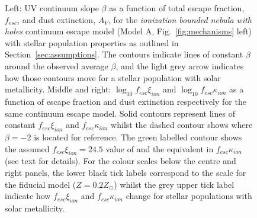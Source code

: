 \begin{figure}
  \caption{Left: UV continuum slope $\beta$ as a function of total escape fraction, $f_{esc}$, and dust extinction, $A_{V}$, for the \emph{ionization bounded nebula with holes} continuum escape model (Model A, Fig.~\ref{fig:mechanisms} left) with stellar population properties as outlined in Section~\ref{sec:assumptions}. The contours indicate lines of constant $\beta$ around the observed average $\beta$, and the light grey arrow indicates how those contours move for a stellar population with solar metallicity. Middle and right: $\log_{10}f_{esc}\xi_{ion}$ and $\log_{10}f_{esc}\kappa_{ion}$ as a function of escape fraction and dust extinction respectively for the same continuum escape model. Solid contours represent lines of constant $f_{esc}\xi_{ion}$ and $f_{esc}\kappa_{ion}$ whilst the dashed contour shows where $\beta = -2$ is located for reference. The green labelled contour shows the assumed $f_{esc}\xi_{ion} = 24.5$ value of \citet{Robertson:2013ji} and the equivalent in $f_{esc}\kappa_{ion}$ (see text for details). For the colour scales below the centre and right panels, the lower black tick labels correspond to the scale for the fiducial model ($Z = 0.2 Z_{\odot}$) whilst the grey upper tick label indicate how $f_{esc}\xi_{ion}$ and $f_{esc}\kappa_{ion}$ change for stellar populations with solar metallicity.}
  \label{fig:fesc_cover}
\end{figure}

